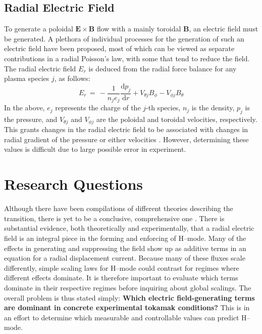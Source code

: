 \subsection{Radial Electric Field}\label{ssec:E_r}
To generate a poloidal $\mathbf{E}\times\mathbf{B}$ flow with a mainly toroidal $\mathbf{B}$, an electric field must be generated.
A plethora of individual processes for the generation of such an electric field have been proposed, most of which can be viewed as separate contributions in a radial Poisson's law, with some that tend to reduce the field.
The radial electric field $E_r$ is deduced from the radial force balance for any plasma species $j$, as follows:
\begin{equation}
	E_r \,=\, -\frac{1}{n_j e_j} \frac{\text{d} p_j}{\text{d} r} + V_{\theta j} B_\phi - V_{\phi j} B_\theta
	\label{eq:E_r}
\end{equation}
In the above, $e_j$ represents the charge of the $j$-th species, $n_j$ is the density, $p_j$ is the pressure, and $V_{\theta j}$ and $V_{\phi j}$ are the poloidal and toroidal velocities, respectively.
This grants changes in the radial electric field to be associated with changes in radial gradient of the pressure or either velocities \cite{connor_review_2000}\cite{staps_backstepping_2017}.
However, determining these values is difficult due to large possible error in experiment.

\section{Research Questions}\label{sec:research_questions}
Although there have been compilations of different theories describing the transition, there is yet to be a conclusive, comprehensive one \cite{connor_review_2000}.
There is substantial evidence, both theoretically and experimentally, that a radial electric field is an integral piece in the forming and enforcing of H--mode.
Many of the effects in generating and suppressing the field show up as additive terms in an equation for a radial displacement current.
Because many of these fluxes scale differently, simple scaling laws for H--mode could contrast for regimes where different effects dominate.
It is therefore important to evaluate which terms dominate in their respective regimes before inquiring about global scalings.
The overall problem is thus stated simply: \textbf{Which electric field-generating terms are dominant in concrete experimental tokamak conditions?}
This is in an effort to determine which measurable and controllable values can predict H--mode.

